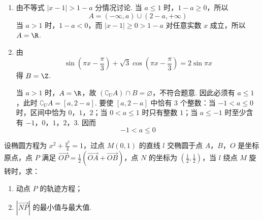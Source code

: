 \begin{solution}
\begin{enumerate}
\item 由不等式 \(|x-1|>1-a\) 分情况讨论. 当 \(a\leq1\) 时，\(1-a\geq0\)，所以
\[
A=(-\infty,a)\cup(2-a,+\infty)
\]
当 \(a>1\) 时，\(1-a<0\)，而 \(|x-1|\geq0>1-a\) 对任意实数 \(x\) 成立，所以 \(A=\R\).

\item 由
\[
\sin\left(\pi x-\frac\pi3\right)+\sqrt3\cos\left(\pi x-\frac\pi3\right)=2\sin\pi x
\]
得 \(B=\Z\).

当 \(a>1\) 时，\(A=\R\)，故 \((\complement_U A)\cap B=\varnothing\)，不符合题意. 因此必须有 \(a\leq1\)，此时
\(\complement_U A=[a,2-a]\). 要使 \([a,2-a]\) 中恰有 \(3\) 个整数：当 \(-1<a\leq0\) 时，区间中恰为 \(0\)，\(1\)，\(2\)；当 \(0<a\leq1\) 时只有整数 \(1\)；当 \(a\leq-1\) 时至少含有 \(-1\)，\(0\)，\(1\)，\(2\)，\(3\). 因而
\[
-1<a\leq0
\]
\end{enumerate}
\end{solution}

\begin{problem}
设椭圆方程为 \(x^{2} + \frac{y^{2}}{4} = 1\)，过点 \(M(0,1)\) 的直线 \(l\) 交椭圆于点 \(A\)，\(B\)，\(O\) 是坐标原点，点 \(P\) 满足 \(\overrightarrow{OP} = \frac{1}{2} \left( \overrightarrow{OA} + \overrightarrow{OB} \right)\)，点 \(N\) 的坐标为 \(\left(\frac{1}{2}, \frac{1}{2}\right)\)，当 \(l\) 绕点 \(M\) 旋转时，求：

\begin{enumerate}
\item 动点 \(P\) 的轨迹方程；
\item \(|\overrightarrow{NP}|\) 的最小值与最大值.
\end{enumerate}
\end{problem}

